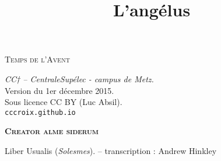 \documentclass[11pt]{scrbook}
\title{L'angélus}
\author{}
\begin{document}
\begin{center}
\Huge \textsc{Temps de l'Avent}
\vspace{0.4cm}

\normalsize \small \emph{CC† -- CentraleSupélec - campus de Metz.} \\ \small Version du 1\textup{er} décembre 2015. \\ \small Sous licence CC BY (Luc Absil). \\\texttt{cccroix.github.io} 
\end{center}

\vspace{1cm}

\textbf{\textsc{Creator alme siderum}}


{\flushright Liber Usualis (\emph{Solesmes}). \small-- transcription : Andrew Hinkley\\}

\end{document}
